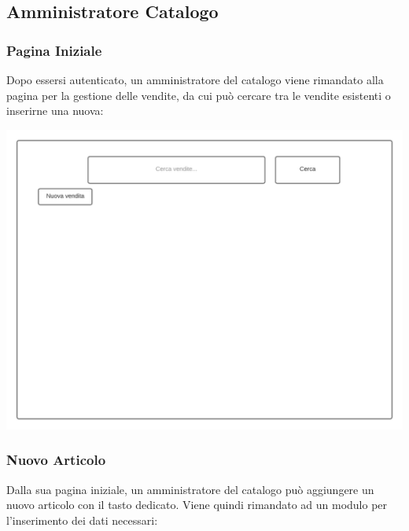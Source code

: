 \documentclass[12pt]{article}
\begin{document}
\newpage

\subsection{Amministratore Catalogo}
\subsubsection{Pagina Iniziale}
Dopo essersi autenticato, un amministratore del catalogo viene rimandato alla pagina per la gestione delle vendite, da cui può cercare tra le vendite esistenti o inserirne una nuova:

\begin{center}
\includegraphics[height=0.3\textheight]{Mockup/AmministratoreCatalogo/PaginaIniziale}
\end{center}

\subsubsection{Nuovo Articolo}
Dalla sua pagina iniziale, un amministratore del catalogo può aggiungere un nuovo articolo con il tasto dedicato. Viene quindi rimandato ad un modulo per l'inserimento dei dati necessari:
\end{document}
